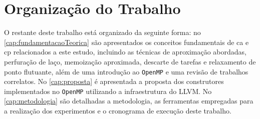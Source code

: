 \section{Organização do Trabalho}\label{cap:org_trabalho}

O restante deste trabalho está organizado da seguinte forma: no \autoref{cap:fundamentacaoTeorica} são apresentados os conceitos fundamentais de \gls{ca} e \gls{cp} relacionados a este estudo, incluindo as técnicas de aproximação abordadas, perfuração de laço, memoização aproximada, descarte de tarefas e relaxamento de ponto flutuante, além de uma introdução ao \texttt{OpenMP} e uma revisão de trabalhos correlatos. No \autoref{cap:proposta} é apresentada a proposta dos construtores implementados no \texttt{OpenMP} utilizando a infraestrutura do LLVM. No \autoref{cap:metodologia} são detalhadas a metodologia, as ferramentas empregadas para a realização dos experimentos e o cronograma de execução deste trabalho.

